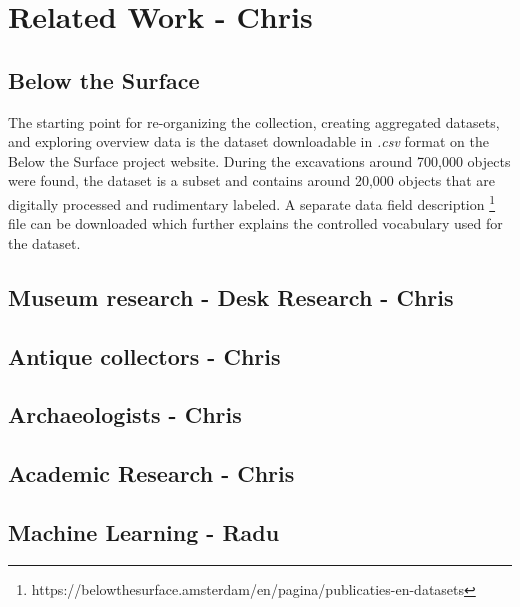 \section{Related Work - Chris}

\subsection{Below the Surface}

The starting point for re-organizing the collection, creating aggregated datasets, and exploring overview data is the dataset downloadable in \textit{.csv} format on the Below the Surface project website. During the excavations around 700,000 objects were found, the dataset is a subset and contains around 20,000 objects that are digitally processed and rudimentary labeled. A separate data field description \footnote{https://belowthesurface.amsterdam/en/pagina/publicaties-en-datasets} file can be downloaded which further explains the controlled vocabulary used for the dataset.

\subsection{Museum research - Desk Research - Chris}

\subsection{Antique collectors - Chris}

\subsection{Archaeologists - Chris}

\subsection{Academic Research - Chris}

\subsection{Machine Learning - Radu}
